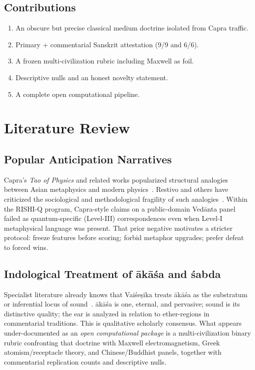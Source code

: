 \documentclass[12pt]{article}
\newcommand{\Vais}{Vaiśeṣika}
\newcommand{\akasa}{ākāśa}
\newcommand{\sabda}{śabda}
\begin{document}
\subsection{Contributions}
\begin{enumerate}
\item An obscure but precise classical medium doctrine isolated from Capra traffic.
\item Primary + commentarial Sanskrit attestation (9/9 and 6/6).
\item A frozen multi-civilization rubric including Maxwell as foil.
\item Descriptive nulls and an honest novelty statement.
\item A complete open computational pipeline.
\end{enumerate}

\section{Literature Review}

\subsection{Popular Anticipation Narratives}
Capra's \emph{Tao of Physics} and related works popularized structural analogies between Asian metaphysics and modern physics~\citep{capra1975}.
Restivo and others have criticized the sociological and methodological fragility of such analogies~\citep{restivo1983}.
Within the RISHI-Q program, Capra-style claims on a public-domain Vedānta panel failed as quantum-specific (Level-III) correspondences even when Level-I metaphysical language was present.
That prior negative motivates a stricter protocol: freeze features before scoring; forbid metaphor upgrades; prefer defeat to forced wins.

\subsection{Indological Treatment of \akasa{} and \sabda}
Specialist literature already knows that \Vais{} treats \akasa{} as the substratum or inferential locus of sound~\citep{halbfass1992,potter1977}.
\akasa{} is one, eternal, and pervasive; sound is its distinctive quality; the ear is analyzed in relation to ether-regions in commentarial traditions.
This is qualitative scholarly consensus.
What appears under-documented as an \emph{open computational package} is a multi-civilization binary rubric confronting that doctrine with Maxwell electromagnetism, Greek atomism/receptacle theory, and Chinese/Buddhist panels, together with commentarial replication counts and descriptive nulls.
\end{document}
